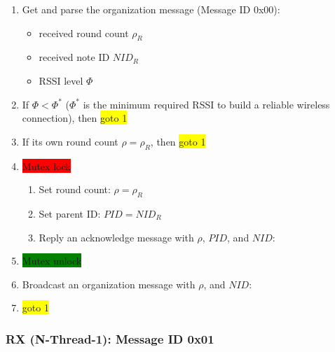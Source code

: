 \documentclass[letterpaper,10pt]{article}
\begin{document}
\begin{enumerate}
	\item Get and parse the organization message (Message ID 0x00):
	\begin{itemize}
		\item received round count $\rho_R$
		\item received note ID $NID_R$
		\item RSSI level $\Phi$
	\end{itemize}
	\item If $\Phi<\Phi^*$ ($\Phi^*$ is the minimum required RSSI to build a reliable wireless connection), then \colorbox{yellow}{goto 1}
	\item If its own round count $\rho=\rho_R$, then \colorbox{yellow}{goto 1}
	\item \colorbox{red}{Mutex lock}
	\begin{enumerate}
		\item Set round count: $\rho=\rho_R$
		\item Set parent ID: $PID=NID_R$
		\item Reply an acknowledge message with $\rho$, $PID$, and $NID$:\\
	\end{enumerate}
	\item \colorbox{green}{Mutex unlock}
	\item Broadcast an organization message with $\rho$, and $NID$:\\
	\item \colorbox{yellow}{goto 1}
\end{enumerate}

\subsubsection{RX (N-Thread-1): Message ID 0x01}
\end{document}
